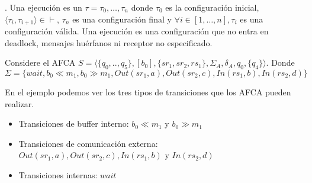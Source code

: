 




\begin{definition}. Una ejecución es un $ \tau = \tau_0, \ldots,\tau_n $ donde $\tau_0$ es la configuración inicial, $\langle \tau_i, \tau_{i+1} \rangle \in \vdash$, $\tau_n$ es una configuración final y $ \forall i \in [1, \ldots, n], \tau_i$ es una configuración válida. Una ejecución es una configuración que no entra en deadlock, mensajes huérfanos ni receptor no especificado.
\end{definition}

\begin{ejemplo}
\label{ex:AFCA}
Considere el AFCA $S= \langle \{q_0,..,q_5\},[b_0],\{sr_1,sr_2,rs_1\}, \Sigma_A, \delta_A, q_0, \{q_4\} \rangle$. Donde $\Sigma =\{wait, b_0 \ll m_1,b_0 \gg m_1, Out(sr_1,a),Out(sr_2,c), In(rs_1,b),In(rs_2,d) \}$
\begin{center}
\end{center}
En el ejemplo podemos ver los tres tipos de transiciones que los AFCA pueden realizar. 

\begin{itemize}
    \item Transiciones de buffer interno: $b_0 \ll m_1$ y $b_0 \gg m_1$
    \item Transiciones de comunicación externa: $Out(sr_1,a),Out(sr_2,c), In(rs_1,b)$ y $In(rs_2,d) $
    \item Transiciones internas: $wait$
\end{itemize}
\end{ejemplo}

